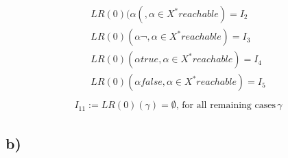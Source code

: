 \begin{equation*}
\begin{split}
	LR(0)(\alpha(, \alpha \in X^* reachable) = I_2\\
	LR(0)(\alpha\neg , \alpha \in X^* reachable) = I_3\\
	LR(0)(\alpha true, \alpha \in X^* reachable) = I_4\\
	LR(0)(\alpha false, \alpha \in X^* reachable) = I_5\\
\end{split}
\end{equation*}
\begin{equation*}
\begin{split}
	I_{11} := LR(0)(\gamma) = \emptyset \text{, for all remaining cases} \,\gamma
\end{split}
\end{equation*}

\subsection*{b)}

